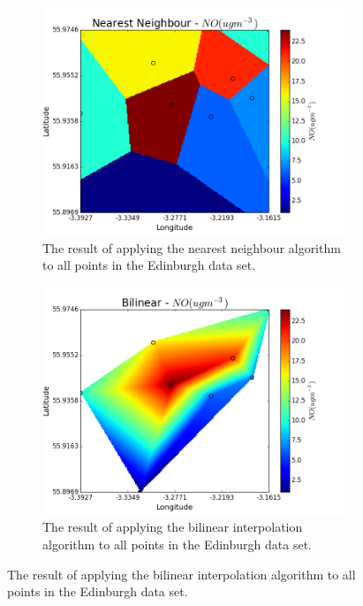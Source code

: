 			\begin{figure}[H]
                \centering
                \begin{subfigure}{0.45\textwidth}
                    \centering
                    \includegraphics[width=0.9\linewidth]{./images/Edinburgh_Nearest_Neighbour.png}
                    \caption{The result of applying the nearest neighbour algorithm to all points in the Edinburgh data set.}
                    \label{fig:edinburgh_nearest_neighbour}
                \end{subfigure}%
                \begin{subfigure}{0.45\textwidth}
                    \includegraphics[width=0.9\linewidth]{./images/Edinburgh_Bilinear.png}
                    \caption{The result of applying the bilinear interpolation algorithm to all points in the Edinburgh data set.}
                    \label{fig:edinburgh_bilinear}
                \end{subfigure}
            \end{figure}



